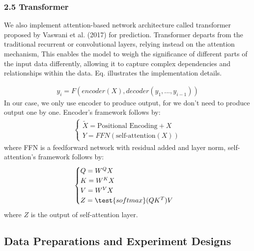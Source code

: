 \documentclass[10pt,letterpaper]{article}
\begin{document}
\subsubsection* {2.5 Transformer}
We also implement attention-based network architecture called transformer proposed by Vaswani et al. (2017) for prediction. Transformer departs from the traditional recurrent or convolutional layers, relying instead on the attention mechanism, This enables the model to weigh the significance of different parts of the input data differently, allowing it to capture complex dependencies and relationships within the data. Eq. illustrates the implementation details.

\begin{eqnarray}
\label{eq: Transformer}
    y_i = F(encoder(X), decoder(y_1,...,y_{i - 1}))
\end{eqnarray}
In our case, we only use encoder to produce output, for we don't need to produce output one by one. Encoder's framework follows by:
\begin{eqnarray}
\label{eq: TransformerDecoder}
    \begin {cases} \tilde{X} = \text{Positional Encoding} + X
    \\Y = FFN(\text{self-attention}(X))
    \end {cases}
\end{eqnarray}
where FFN is a feedforward network with residual added and layer norm, self-attention's framework follows by:
\begin{eqnarray}
\label{eq: self-attention}
    \begin {cases} Q = W^QX
    \\K = W^KX
    \\V = W^VX
    \\Z = \test{softmax}(QK^T)V
    \end {cases}
\end{eqnarray}
where $Z$ is the output of self-attention layer.
\subsection*{Data Preparations and Experiment Designs}
\end{document}
